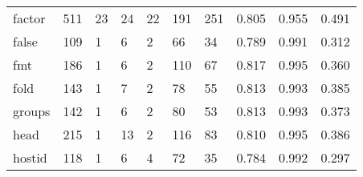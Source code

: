\begin{longtable}{lp{1.3cm}p{1.3cm}p{1.3cm}p{1.3cm}p{1.3cm}p{1.3cm}p{1.3cm}p{1.3cm}p{1.3cm}}
factor    &                    511 &                                 23 &                                24 &                               22 &                               191 &                             251 &                                   0.805 &                                  0.955 &                                0.491 \\
false     &                    109 &                                  1 &                                 6 &                                2 &                                66 &                              34 &                                   0.789 &                                  0.991 &                                0.312 \\
fmt       &                    186 &                                  1 &                                 6 &                                2 &                               110 &                              67 &                                   0.817 &                                  0.995 &                                0.360 \\
fold      &                    143 &                                  1 &                                 7 &                                2 &                                78 &                              55 &                                   0.813 &                                  0.993 &                                0.385 \\
groups    &                    142 &                                  1 &                                 6 &                                2 &                                80 &                              53 &                                   0.813 &                                  0.993 &                                0.373 \\
head      &                    215 &                                  1 &                                13 &                                2 &                               116 &                              83 &                                   0.810 &                                  0.995 &                                0.386 \\
hostid    &                    118 &                                  1 &                                 6 &                                4 &                                72 &                              35 &                                   0.784 &                                  0.992 &                                0.297 \\

\end{longtable}
